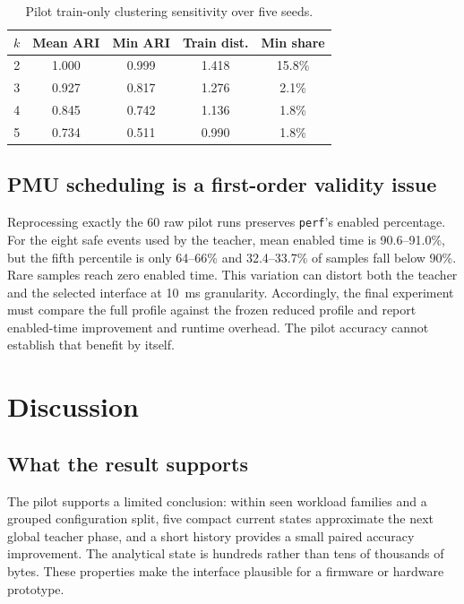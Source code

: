 \documentclass[conference,10pt]{IEEEtran}
\begin{document}
\begin{table}[t]
\centering
\caption{Pilot train-only clustering sensitivity over five seeds.}
\label{tab:k-stability}
\footnotesize
\begin{tabular}{ccccc}
\toprule
$k$ & Mean ARI & Min ARI & Train dist. & Min share \\
\midrule
2 & 1.000 & 0.999 & 1.418 & 15.8\% \\
3 & 0.927 & 0.817 & 1.276 & 2.1\% \\
4 & 0.845 & 0.742 & 1.136 & 1.8\% \\
5 & 0.734 & 0.511 & 0.990 & 1.8\% \\
\bottomrule
\end{tabular}
\end{table}

\subsection{PMU scheduling is a first-order validity issue}

Reprocessing exactly the 60 raw pilot runs preserves \texttt{perf}'s enabled percentage.
For the eight safe events used by the teacher, mean enabled time is 90.6--91.0\%, but
the fifth percentile is only 64--66\% and 32.4--33.7\% of samples fall below 90\%.
Rare samples reach zero enabled time. This variation can distort both the teacher and
the selected interface at 10~ms granularity. Accordingly, the final experiment must
compare the full profile against the frozen reduced profile and report enabled-time
improvement and runtime overhead. The pilot accuracy cannot establish that benefit by
itself.

\section{Discussion}

\subsection{What the result supports}

The pilot supports a limited conclusion: within seen workload families and a grouped
configuration split, five compact current states approximate the next global teacher
phase, and a short history provides a small paired accuracy improvement. The analytical
state is hundreds rather than tens of thousands of bytes. These properties make the
interface plausible for a firmware or hardware prototype.
\end{document}
